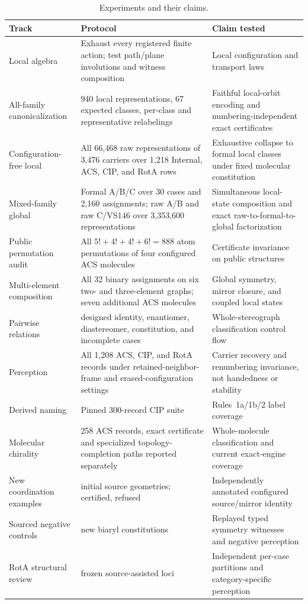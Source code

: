 \documentclass[pdflatex,sn-mathphys-num,referee,lineno]{sn-jnl}
\theoremstyle{plain}
\theoremstyle{remark}
\theoremstyle{definition}
\begin{document}
\begin{table}[htbp]
\caption{Experiments and their claims.}
\label{tab:experiment-inventory}
\centering
\small
\begin{tabularx}{\textwidth}{@{}lXX@{}}
\toprule
Track & Protocol & Claim tested \\
\midrule
Local algebra & Exhaust every registered finite action; test path/plane
involutions and witness composition & Local configuration and transport laws \\
All-family canonicalization & 940 local representations, 67 expected classes,
per-class and representative relabelings & Faithful local-orbit encoding and
numbering-independent exact certificates \\
Configuration-free local & All 66,468 raw representations of 3,476 carriers
over 1,218 Internal, ACS, CIP, and RotA rows & Exhaustive collapse to formal
local classes under fixed molecular constitution \\
Mixed-family global & Formal A/B/C over 30 cases and 2,160 assignments; raw
A/B and raw C/VS146 over 3,353,600 representations & Simultaneous local-state
composition and exact raw-to-formal-to-global factorization \\
Public permutation audit & All \(5!+4!+4!+6!=888\) atom permutations of four
configured ACS molecules & Certificate invariance on public structures \\
Multi-element composition & All 32 binary assignments on six two- and
three-element graphs; seven additional ACS molecules & Global symmetry,
mirror closure, and coupled local states \\
Pairwise relations & \RelationCases{} designed identity, enantiomer, diastereomer,
constitution, and incomplete cases & Whole-stereograph classification control flow \\
Perception & All 1,208 ACS, CIP, and RotA records under retained-neighbor-frame
and erased-configuration settings & Carrier recovery and renumbering
invariance, not handedness or stability \\
Derived naming & Pinned 300-record CIP suite & Rules~1a/1b/2 label coverage \\
Molecular chirality & 258 ACS records, exact certificate and specialized
topology-completion paths reported separately & Whole-molecule classification
and current exact-engine coverage \\
New coordination examples & \ChemicalCoordinationSelected{} initial source geometries;
\ChemicalCoordinationCertified{} certified, \ChemicalCoordinationUnresolved{} refused
 & Independently annotated configured source/mirror identity \\
Sourced negative controls & \ChemicalNegativeSelected{} new biaryl constitutions
 & Replayed typed symmetry witnesses and negative perception \\
RotA structural review & \ChemicalRotASelected{} frozen source-assisted loci
 & Independent per-case partitions and category-specific perception \\
\bottomrule
\end{tabularx}
\end{table}
\end{document}
